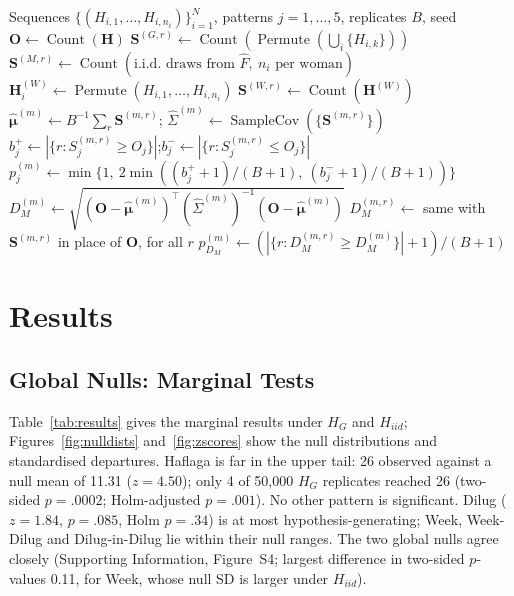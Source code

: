 \documentclass[12pt]{article}
\newcommand{\HG}{H_{G}}
\newcommand{\HI}{H_{iid}}
\newcommand{\DM}{D_{M}}
\begin{document}
\begin{algorithm}[!htbp]
\caption{Simulation pipeline}
\label{alg:sim}
\begin{algorithmic}[1]
\Require Sequences $\{(H_{i,1},\ldots,H_{i,n_i})\}_{i=1}^{N}$, patterns $j=1,\ldots,5$,
         replicates $B$, seed
\State $\mathbf{O} \leftarrow \operatorname{Count}(\mathbf{H})$
  \State $\mathbf{S}^{(G,r)} \leftarrow \operatorname{Count}(\operatorname{Permute}(\bigcup_i\{H_{i,k}\}))$
  \State $\mathbf{S}^{(M,r)} \leftarrow \operatorname{Count}(\text{i.i.d.\ draws from } \hat F,\ n_i \text{ per woman})$
   $\mathbf{H}^{(W)}_i \leftarrow \operatorname{Permute}(H_{i,1},\ldots,H_{i,n_i})$ \EndFor
  \State $\mathbf{S}^{(W,r)} \leftarrow \operatorname{Count}(\mathbf{H}^{(W)})$
\EndFor
{}
  \State $\hat{\boldsymbol\mu}^{(m)} \leftarrow B^{-1}\sum_r \mathbf{S}^{(m,r)}$;\quad
         $\hat\Sigma^{(m)} \leftarrow \operatorname{SampleCov}(\{\mathbf{S}^{(m,r)}\})$
    \State $b_j^+ \leftarrow |\{r : S_j^{(m,r)} \geq O_j\}|$;\quad $b_j^- \leftarrow |\{r : S_j^{(m,r)} \leq O_j\}|$
    \State $p_j^{(m)} \leftarrow \min\{1,\ 2\min((b_j^+ + 1)/(B+1),\ (b_j^- + 1)/(B+1))\}$ 
  \EndFor
  \State $\DM^{(m)} \leftarrow \sqrt{(\mathbf{O}-\hat{\boldsymbol\mu}^{(m)})^\top(\hat\Sigma^{(m)})^{-1}(\mathbf{O}-\hat{\boldsymbol\mu}^{(m)})}$
  \State $\DM^{(m,r)} \leftarrow$ same with $\mathbf{S}^{(m,r)}$ in place of $\mathbf{O}$, for all $r$
  \State $p_{\DM}^{(m)} \leftarrow (|\{r : \DM^{(m,r)} \geq \DM^{(m)}\}| + 1)/(B+1)$
\EndFor
\end{algorithmic}
\end{algorithm}

\section{Results}

\subsection{Global Nulls: Marginal Tests}
\label{sec:marginal}

Table~\ref{tab:results} gives the marginal results under $\HG$ and $\HI$;
Figures~\ref{fig:nulldists} and~\ref{fig:zscores} show the null distributions and
standardised departures. Haflaga is far in the upper tail: 26 observed against a null
mean of 11.31 ($z = 4.50$); only 4 of 50,000 $\HG$ replicates reached 26 (two-sided
$p = .0002$; Holm-adjusted $p = .001$). No other pattern is significant. Dilug
($z = 1.84$, $p = .085$, Holm $p = .34$) is at most hypothesis-generating; Week,
Week-Dilug and Dilug-in-Dilug lie within their null ranges. The two global nulls agree
closely (Supporting Information, Figure~S4; largest difference in two-sided $p$-values 0.11, for
Week, whose null SD is larger under $\HI$).
\end{document}
